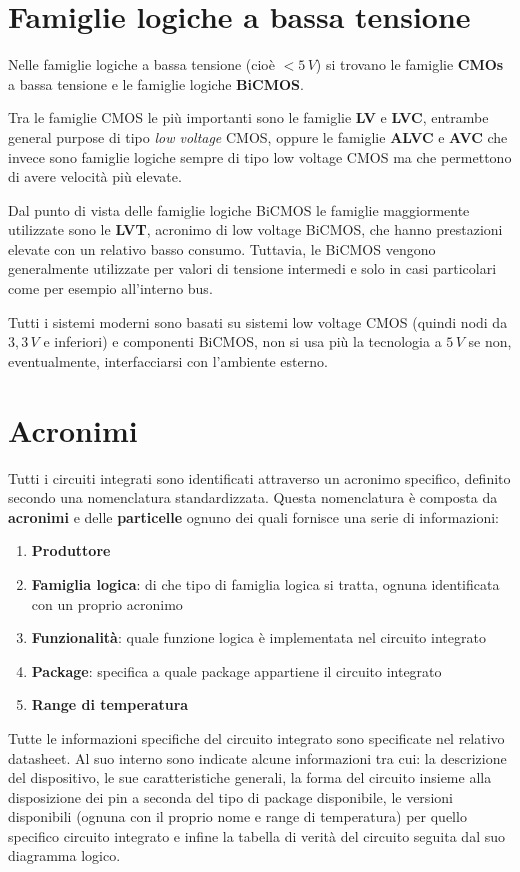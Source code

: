 \documentclass[12pt, a4paper]{report}
\begin{document}
\section{Famiglie logiche a bassa tensione}
Nelle famiglie logiche a bassa tensione (cioè $< 5\,V$) si trovano le famiglie \textbf{CMOs} a bassa tensione e le famiglie logiche \textbf{BiCMOS}.

Tra le famiglie CMOS le più importanti sono le famiglie \textbf{LV} e \textbf{LVC}, entrambe general purpose di tipo \textit{low voltage} CMOS, oppure le famiglie \textbf{ALVC} e \textbf{AVC} che invece sono famiglie logiche sempre di tipo low voltage CMOS ma che permettono di avere velocità più elevate.

Dal punto di vista delle famiglie logiche BiCMOS le famiglie maggiormente utilizzate sono le \textbf{LVT}, acronimo di low voltage BiCMOS, che hanno prestazioni elevate con un relativo basso consumo. Tuttavia, le BiCMOS vengono generalmente utilizzate per valori di tensione intermedi e solo in casi particolari come per esempio all'interno bus.

Tutti i sistemi moderni sono basati su sistemi low voltage CMOS (quindi nodi da $3,3\,V$ e inferiori) e componenti BiCMOS, non si usa più la tecnologia a $5\,V$ se non, eventualmente, interfacciarsi con l'ambiente esterno.

\section{Acronimi}
Tutti i circuiti integrati sono identificati attraverso un acronimo specifico, definito secondo una nomenclatura standardizzata. Questa nomenclatura è composta da \textbf{acronimi} e delle \textbf{particelle} ognuno dei quali fornisce una serie di informazioni:
\begin{enumerate}
    \item\textbf{Produttore}
    \item\textbf{Famiglia logica}: di che tipo di famiglia logica si tratta, ognuna identificata con un proprio acronimo
    \item\textbf{Funzionalità}: quale funzione logica è implementata nel circuito integrato
    \item\textbf{Package}: specifica a quale package appartiene il circuito integrato
    \item\textbf{Range di temperatura}
\end{enumerate}
Tutte le informazioni specifiche del circuito integrato sono specificate nel relativo datasheet. Al suo interno sono indicate alcune informazioni tra cui: la descrizione del dispositivo, le sue caratteristiche generali, la forma del circuito insieme alla disposizione dei pin a seconda del tipo di package disponibile, le versioni disponibili (ognuna con il proprio nome e range di temperatura) per quello specifico circuito integrato e infine la tabella di verità del circuito seguita dal suo diagramma logico.
\end{document}
